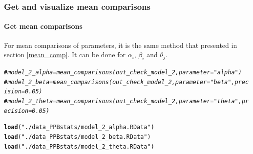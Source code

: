 \documentclass{book}\usepackage[]{graphicx}\usepackage[]{color}
\makeatletter
\newcommand{\hlstr}[1]{\textcolor[rgb]{0.192,0.494,0.8}{#1}}%
\newcommand{\hlcom}[1]{\textcolor[rgb]{0.678,0.584,0.686}{\textit{#1}}}%
\newcommand{\hlopt}[1]{\textcolor[rgb]{0,0,0}{#1}}%
\newcommand{\hlstd}[1]{\textcolor[rgb]{0.345,0.345,0.345}{#1}}%
\newcommand{\hlkwd}[1]{\textcolor[rgb]{0.737,0.353,0.396}{\textbf{#1}}}%
\newenvironment{kframe}{%
 \def\at@end@of@kframe{}%
 \ifinner\ifhmode%
  \def\at@end@of@kframe{\end{minipage}}%
  \begin{minipage}{\columnwidth}%
 \fi\fi%
 \def\FrameCommand##1{\hskip\@totalleftmargin \hskip-\fboxsep
 \colorbox{shadecolor}{##1}\hskip-\fboxsep
     \hskip-\linewidth \hskip-\@totalleftmargin \hskip\columnwidth}%
 \MakeFramed {\advance\hsize-\width
   \@totalleftmargin\z@ \linewidth\hsize
   \@setminipage}}%
 {\par\unskip\endMakeFramed%
 \at@end@of@kframe}
\newenvironment{knitrout}{}{} %
\makeatother
\begin{document}


\subsubsection{Get and visualize mean comparisons}

\paragraph{Get mean comparisons}

For mean comparisons of parameters, it is the same method that presented in section \ref{mean_comp}.
It can be done for $\alpha_i$, $\beta_i$ and $\theta_j$.

\begin{knitrout}
\color{fgcolor}\begin{kframe}
\begin{alltt}
\hlcom{# model_2_alpha = mean_comparisons(out_check_model_2, parameter = "alpha")}
\hlcom{# model_2_beta = mean_comparisons(out_check_model_2, parameter = "beta", precision = 0.05)}
\hlcom{# model_2_theta = mean_comparisons(out_check_model_2, parameter = "theta", precision = 0.05)}

\hlkwd{load}\hlstd{(}\hlstr{"./data_PPBstats/model_2_alpha.RData"}\hlstd{)}
\hlkwd{load}\hlstd{(}\hlstr{"./data_PPBstats/model_2_beta.RData"}\hlstd{)}
\hlkwd{load}\hlstd{(}\hlstr{"./data_PPBstats/model_2_theta.RData"}\hlstd{)}
\end{alltt}
\end{kframe}
\end{knitrout}
\end{document}
